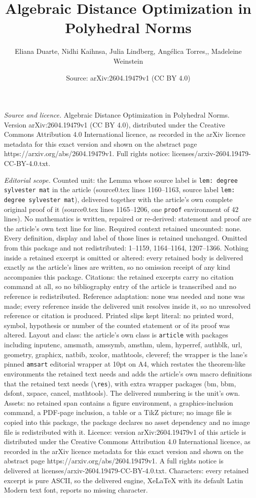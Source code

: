 \documentclass[10pt,a4paper]{amsart}
\title[Algebraic Distance Optimization in Polyhedral Norms]{Algebraic Distance Optimization in Polyhedral Norms}
\author{Eliana Duarte, Nidhi Kaihnsa, Julia Lindberg, Ang\'elica Torres,, Madeleine Weinstein}
\date{Source: arXiv:2604.19479v1 (CC BY 4.0)}
\begin{document}
\maketitle

\noindent\emph{Source and licence.} Algebraic Distance Optimization in Polyhedral Norms. Version arXiv:2604.19479v1 (CC BY 4.0), distributed under the Creative Commons Attribution 4.0 International licence, as recorded in the arXiv licence metadata for this exact version and shown on the abstract page https://arxiv.org/abs/2604.19479v1. Full rights notice: licenses/arxiv-2604.19479-CC-BY-4.0.txt.\par\smallskip

\noindent\textit{Editorial scope.} Counted unit: the Lemma whose source label is \texttt{lem: degree sylvester mat} in the article (source0.tex lines 1160--1163, source label \texttt{lem: degree sylvester mat}), delivered together with the article's own complete original proof of it (source0.tex lines 1165--1206, one \texttt{proof} environment of 42 lines). No mathematics is written, repaired or re-derived: statement and proof are the article's own text line for line. Required context retained uncounted: none. Every definition, display and label of those lines is retained unchanged. Omitted from this package and not redistributed: 1--1159, 1164--1164, 1207--1366. Nothing inside a retained excerpt is omitted or altered: every retained body is delivered exactly as the article's lines are written, so no omission receipt of any kind accompanies this package. Citations: the retained excerpts carry no citation command at all, so no bibliography entry of the article is transcribed and no reference is redistributed. Reference adaptation: none was needed and none was made; every reference inside the delivered unit resolves inside it, so no unresolved reference or citation is produced. Printed slips kept literal: no printed word, symbol, hypothesis or number of the counted statement or of its proof was altered. Layout and class: the article's own class is \texttt{article} with packages including inputenc, amsmath, amssymb, amsthm, ulem, hyperref, authblk, url, geometry, graphicx, natbib, xcolor, mathtools, cleveref; the wrapper is the lane's pinned \texttt{amsart} editorial wrapper at 10pt on A4, which restates the theorem-like environments the retained text needs and adds the article's own macro definitions that the retained text needs (\texttt{\textbackslash res}), with extra wrapper packages (bm, bbm, dsfont, xspace, cancel, mathtools). The delivered numbering is the unit's own. Assets: no retained span contains a figure environment, a graphics-inclusion command, a PDF-page inclusion, a table or a TikZ picture; no image file is copied into this package, the package declares no asset dependency and no image file is redistributed with it. Licence: version arXiv:2604.19479v1 of this article is distributed under the Creative Commons Attribution 4.0 International licence, as recorded in the arXiv licence metadata for this exact version and shown on the abstract page https://arxiv.org/abs/2604.19479v1. A full rights notice is delivered at licenses/arxiv-2604.19479-CC-BY-4.0.txt. Characters: every retained excerpt is pure ASCII, so the delivered engine, XeLaTeX with its default Latin Modern text font, reports no missing character.
\end{document}
